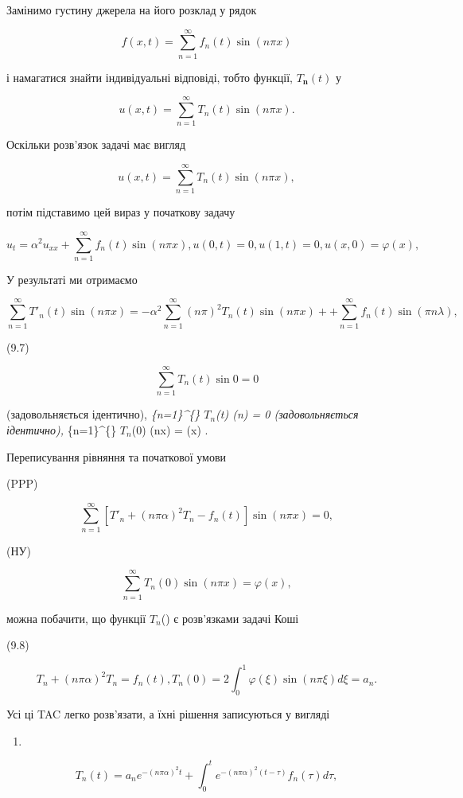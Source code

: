 \documentclass[
  ukrainian,
]{article}
\providecommand{\tightlist}{%
  \setlength{\itemsep}{0pt}\setlength{\parskip}{0pt}}
\begin{document}
Замінимо густину джерела на його розклад у рядок

\[
f(x, t) = \sum_{n=1}^{\infty} f_n(t) \sin(n\pi x)
\]

і намагатися знайти індивідуальні відповіді, тобто функції,
\(T_{\mathbf{n}}(t)\) у

\[
u(x, t) = \sum_{n=1}^{\infty} T_n(t) \sin(n\pi x).
\]

Оскільки розв'язок задачі має вигляд

\[
u(x, t) = \sum_{n=1}^{\infty} T_n(t) \sin(n\pi x),
\]

потім підставимо цей вираз у початкову задачу

\[
u_{t} = \alpha^{2} u_{xx} + \sum_{n=1}^{\infty} f_{n}(t) \sin(n\pi x),
u(0, t) = 0,
u(1, t) = 0,
u(x, 0) = \varphi(x),
\]

У результаті ми отримаємо

\[
\sum_{n=1}^{\infty} T'_n(t) \sin(n\pi x) = -\alpha^2 \sum_{n=1}^{\infty} (n\pi)^2 T_n(t) \sin(n\pi x) + + \sum_{n=1}^{\infty} f_n(t) \sin(\pi n\lambda),
\]

(9.7)

\[
\sum_{n=1}^{\infty} T_n(t) \sin 0 = 0
\]

(задовольняється ідентично), \sum\emph{\{n=1\}\^{}\{\infty\} \(T_n\)(t)
\sin (n\pi) = 0 (задовольняється ідентично), \sum}\{n=1\}\^{}\{\infty\}
\(T_n\)(0) \sin (n\pi x) = \phi(x) .

Переписування рівняння та початкової умови

(PPP)

\[
\sum_{n=1}^{\infty} [T'_n + (n\pi\alpha)^2 T_n - f_n(t)] \sin(n\pi x) = 0,
\]

(НУ)

\[
\sum_{n=1}^{\infty} T_n(0) \sin(n\pi x) = \varphi(x),
\]

можна побачити, що функції \(T_n\)(\ell) є розв'язками задачі Коші

(9.8)

\[
T_{n} + (n\pi\alpha)^{2} T_{n} = f_{n}(t),
T_{n}(0) = 2 \int_{0}^{1} \varphi(\xi) \sin(n\pi\xi) d\xi = a_{n}.
\]

Усі ці TAC легко розв'язати, а їхні рішення записуються у вигляді

\begin{enumerate}
\def\labelenumi{(\arabic{enumi})}
\setcounter{enumi}{98}
\tightlist
\item
\end{enumerate}

\[
T_n(t) = a_n e^{-(n\pi\alpha)^2 t} + \int_0^t e^{-(n\pi\alpha)^2 (t-\tau)} f_n(\tau) d\tau,
\]
\end{document}
